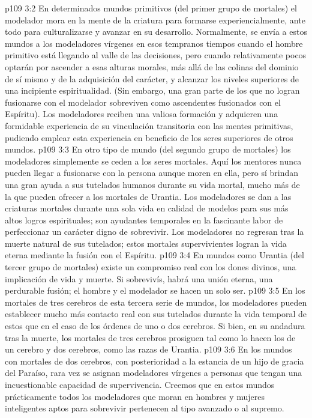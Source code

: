 \vs p109 3:2 En determinados mundos primitivos (del primer grupo de mortales) el modelador mora en la mente de la criatura para formarse experiencialmente, ante todo para culturalizarse y avanzar en su desarrollo. Normalmente, se envía a estos mundos a los modeladores vírgenes en esos tempranos tiempos cuando el hombre primitivo está llegando al valle de las decisiones, pero cuando relativamente pocos optarán por ascender a esas alturas morales, más allá de las colinas del dominio de sí mismo y de la adquisición del carácter, y alcanzar los niveles superiores de una incipiente espiritualidad. (Sin embargo, una gran parte de los que no logran fusionarse con el modelador sobreviven como ascendentes fusionados con el Espíritu). Los modeladores reciben una valiosa formación y adquieren una formidable experiencia de su vinculación transitoria con las mentes primitivas, pudiendo emplear esta experiencia en beneficio de los seres superiores de otros mundos. 
\vs p109 3:3 En otro tipo de mundo (del segundo grupo de mortales) los modeladores simplemente se ceden a los seres mortales. Aquí los mentores nunca pueden llegar a fusionarse con la persona aunque moren en ella, pero sí brindan una gran ayuda a sus tutelados humanos durante su vida mortal, mucho más de la que pueden ofrecer a los mortales de Urantia. Los modeladores se dan a las criaturas mortales durante una sola vida en calidad de modelos para sus más altos logros espirituales; son ayudantes temporales en la fascinante labor de perfeccionar un carácter digno de sobrevivir. Los modeladores no regresan tras la muerte natural de sus tutelados; estos mortales supervivientes logran la vida eterna mediante la fusión con el Espíritu.
\vs p109 3:4 En mundos como Urantia (del tercer grupo de mortales) existe un compromiso real con los dones divinos, una implicación de vida y muerte. Si sobrevivís, habrá una unión eterna, una perdurable fusión; el hombre y el modelador se hacen un solo ser.
\vs p109 3:5 En los mortales de tres cerebros de esta tercera serie de mundos, los modeladores pueden establecer mucho más contacto real con sus tutelados durante la vida temporal de estos que en el caso de los órdenes de uno o dos cerebros. Si bien, en su andadura tras la muerte, los mortales de tres cerebros prosiguen tal como lo hacen los de un cerebro y dos cerebros, como las razas de Urantia.
\vs p109 3:6 En los mundos con mortales de dos cerebros, con posterioridad a la estancia de un hijo de gracia del Paraíso, rara vez se asignan modeladores vírgenes a personas que tengan una incuestionable capacidad de supervivencia. Creemos que en estos mundos prácticamente todos los modeladores que moran en hombres y mujeres inteligentes aptos para sobrevivir pertenecen al tipo avanzado o al supremo.
